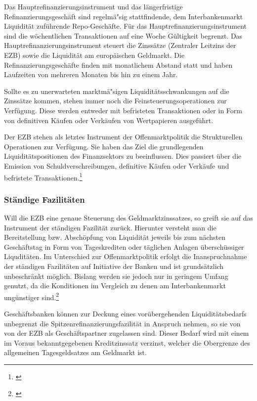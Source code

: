 \documentclass[
        onecolumn,
        a4paper,
        abstracton,
        parskip=half
        ,final
        ]{scrartcl}
\begin{document}
Das Hauptrefinanzierungsinstrument und das l{\"a}ngerfristige Refinanzierungsgesch{\"a}ft sind regelm{\"a}{"s}ig stattfindende, dem Interbankenmarkt Liquidit{\"a}t zuf{\"u}hrende Repo-Gesch{\"a}fte.
F{\"u}r das Hauptrefinanzierungsinstrument sind die w{\"o}chentlichen Transaktionen auf eine Woche G{\"u}ltigkeit begrenzt. Das Hauptrefinanzierungsinstrument steuert die Zinss{\"a}tze (Zentraler Leitzins der EZB) sowie die Liquidit{\"a}t am europ{\"a}ischen Geldmarkt. Die Refinanzierungsgesch{\"a}fte finden mit monatlichem Abstand statt und haben  Laufzeiten von mehreren Monaten bis hin zu einem Jahr.

Sollte es zu unerwarteten marktm{\"a}{"s}igen Liquidit{\"a}tsschwankungen auf die Zinss{\"a}tze kommen, stehen immer noch die Feinsteuerungsoperationen zur Verf{\"u}gung. Diese werden entweder mit befristeten Transaktionen oder in Form von definitiven  K{\"a}ufen oder Verk{\"a}ufen von Wertpapieren ausgef{\"u}hrt.

Der EZB stehen als letztes Instrument der Offenmarktpolitik die Strukturellen Operationen zur Verf{\"u}gung. Sie haben das Ziel die grundlegenden Liquidit{\"a}tspositionen des Finanzsektors zu beeinflussen. Dies passiert {\"u}ber die Emission von Schuldverschreibungen, definitive K{\"a}ufen oder Verk{\"a}ufe und befristete Transaktionen.\footnote[58]{\citep*[S.560]{Basseler2010}}

\subsubsection{St{\"a}ndige Fazilit{\"a}ten}  %

Will die EZB eine genaue Steuerung des Geldmarktzinssatzes, so greift sie auf das Instrument der st{\"a}ndigen Fazilit{\"a}t zur{\"u}ck. Hierunter versteht man die Bereitstellung bzw. Absch{\"o}pfung von Liquidit{\"a}t jeweils bis zum n{\"a}chsten Gesch{\"a}ftstag in Form von Tageskrediten oder t{\"a}glichen Anlagen {\"u}bersch{\"u}ssiger Liqudit{\"a}ten. Im Unterschied zur Offenmarktpolitik erfolgt die Inanspruchnahme der st{\"a}ndigen Fazilit{\"a}ten auf Initiative der Banken und ist grunds{\"a}tzlich unbeschr{\"a}nkt m{\"o}glich. Bislang werden sie jedoch nur in geringem Umfang genutzt, da die Konditionen im Vergleich zu denen am Interbankenmarkt ung{\"u}nstiger sind.\footnote[59]{\citep*[vgl.][S.560ff]{Basseler2010}}

Gesch{\"a}ftsbanken k{\"o}nnen zur Deckung eines vor{\"u}bergehenden Liquidit{\"a}tsbedarfs unbegrenzt die Spitzenrefinanzierungsfazilit{\"a}t in Anspruch nehmen, so sie von von der EZB als Gesch{\"a}ftspartner zugelassen sind. Dieser Bedarf wird mit einem im Voraus bekanntgegebenen Kreditzinssatz verzinst, welcher die Obergrenze des allgemeinen Tagesgeldsatzes am Geldmarkt ist.
\end{document}
